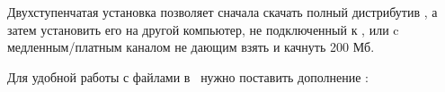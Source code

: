 
\bigskip Двухступенчатая установка позволяет сначала скачать полный дистрибутив
\miktex, а затем установить его на другой компьютер, не подключенный к
\internet, или c медленным/платным каналом не дающим взять и качнуть 200 Мб.

\bigskip Для удобной работы с  файлами в \eclipse\ нужно поставить 
дополнение :

\bigskip
{}



\dirtree{%
.1 TeXlipse.
.2 \checkbox\ TeXlipse.
}
